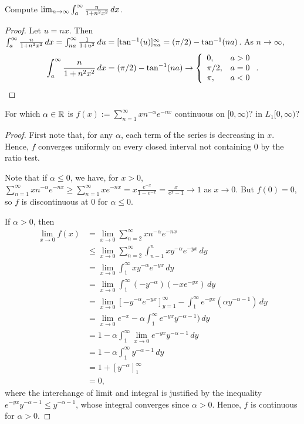 \documentclass{article}
\begin{document}
 Compute $\lim_{n\to\infty} \int_a^\infty \frac{n}{1+n^2x^2} \,dx$.
\begin{proof}
Let $u = nx$. Then $\int_a^\infty \frac{n}{1+n^2x^2} \,dx = \int_{na}^\infty \frac{1}{1+u^2} \,du 
= [\tan^{-1}(u)]_{na}^\infty = (\pi/2) - \tan^{-1}(na)$. As $n\to\infty$, 
$$\int_a^\infty \frac{n}{1+n^2x^2} \,dx = (\pi/2) - \tan^{-1}(na) \to \left\{ 
\begin{array}{lr}
       0, &  a > 0\\
       \pi/2, & a = 0\\
       \pi, & a < 0
     \end{array}
\right. .$$
\end{proof}
 For which $\alpha \in \mathbb{R}$ is $f(x) := \sum_{n=1}^\infty xn^{-\alpha} e^{-nx}$ continuous on $[0,\infty)$? in $L_1[0,\infty)$?
\begin{proof}
First note that, for any $\alpha$, each term of the series is decreasing in $x$. Hence, $f$ converges uniformly on every closed interval not containing $0$ by the ratio test.

Note that if $\alpha \le 0$, we have, for $x>0$,
$\sum_{n=1}^\infty xn^{-\alpha} e^{-nx} \ge \sum_{n=1}^\infty x e^{-nx} = x \frac{e^{-x}}{1 - e^{-x}}  = \frac x {e^x - 1} \to 1$
as $x \to 0$. But $f(0) = 0$, so $f$ is discontinuous at $0$ for $\alpha \le 0$.

If $\alpha > 0$, then 
\begin{align*}
\lim_{x\to 0} f(x) & = \lim_{x\to 0} \sum_{n=2}^\infty xn^{-\alpha} e^{-nx}
\\ & \le \lim_{x\to 0} \sum_{n=2}^\infty \int_{n-1}^n xy^{-\alpha} e^{-yx} \,dy
\\ & = \lim_{x\to 0} \int_{1}^\infty xy^{-\alpha} e^{-yx} \,dy
\\ & = \lim_{x\to 0} \int_{1}^\infty (-y^{-\alpha}) (-x e^{-yx}) \,dy
\\ & = \lim_{x\to 0} [-y^{-\alpha} e^{-yx}]_{y=1}^\infty - \int_1^\infty e^{-yx} (\alpha y^{-\alpha -1}) \,dy
\\ & = \lim_{x\to 0} e^{-x} - \alpha \int_1^\infty e^{-yx} y^{-\alpha -1}) \,dy
\\ & = 1 - \alpha \int_1^\infty \lim_{x\to 0} e^{-yx}  y^{-\alpha -1} \,dy
\\ & = 1 - \alpha \int_1^\infty y^{-\alpha -1} \,dy
\\ & = 1 + [y^{-\alpha}]_1^\infty
\\ & = 0,
\end{align*}
where the interchange of limit and integral is justified by the inequality $e^{-yx} y^{-\alpha -1} \le y^{-\alpha -1}$, whose integral converges since $\alpha > 0$.  Hence, $f$ is continuous for $\alpha > 0$.


\end{proof}
\end{document}
